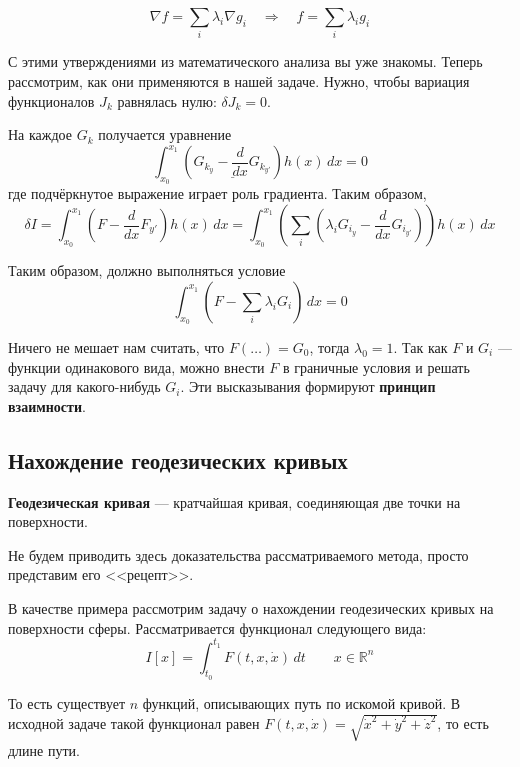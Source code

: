 \documentclass[12pt]{article}
\begin{document}
		$$\nabla f = \sum_i \lambda_i \nabla g_i \quad \Rightarrow \quad f = \sum_i \lambda_i g_i$$

		С этими утверждениями из математического анализа вы уже знакомы. Теперь рассмотрим, как они
		применяются в нашей задаче. Нужно, чтобы вариация функционалов $J_k$ равнялась нулю:
		$\delta J_k = 0$.

		На каждое $G_k$ получается уравнение
		$$\int_{x_0}^{x_1} \left(\underline{G_{k_y} - \frac{d}{dx}G_{k_{y'}}}\right) h(x)\,dx = 0$$	
		где подчёркнутое выражение играет роль градиента. Таким образом,
		$$\delta I = \int_{x_0}^{x_1} \left(F - \frac{d}{dx}F_{y'}\right)h(x) \,dx 
	  	= \int_{x_0}^{x_1} \left(\sum_i \left(\lambda_i G_{i_y} - \frac{d}{dx}G_{i_{y'}} \right)\right)h(x) 			\,dx$$
	  
		Таким образом, должно выполняться условие
		$$\int_{x_0}^{x_1} \left(F - \sum_i \lambda_i G_i\right) \,dx = 0$$

		Ничего не мешает нам считать, что $F(\ldots) = G_0$, тогда $\lambda_0 = 1$. Так как 
		$F$ и $G_i$ --- функции одинакового вида, можно внести $F$ в граничные условия и решать
		задачу для какого-нибудь $G_i$. Эти высказывания формируют \textbf{принцип взаимности}.


	\subsection{Нахождение геодезических кривых}

		\begin{defi}
			\textbf{Геодезическая кривая} --- кратчайшая кривая, соединяющая две точки на поверхности.
		\end{defi}

		Не будем приводить здесь доказательства рассматриваемого метода, просто представим его <<рецепт>>.

		В качестве примера рассмотрим задачу о нахождении геодезических кривых на поверхности сферы.
		Рассматривается функционал следующего вида:
		$$I[x] = \int_{t_0}^{t_1} F(t,x,\dot{x})\,dt \qquad x \in \mathbb{R}^n$$

		То есть существует $n$ функций, описывающих путь по искомой кривой. В исходной задаче такой
		функционал равен $F(t,x,\dot{x}) = \sqrt{\dot{x}^2 + \dot{y}^2 + \dot{z}^2}$, то есть длине
		пути.
\end{document}
